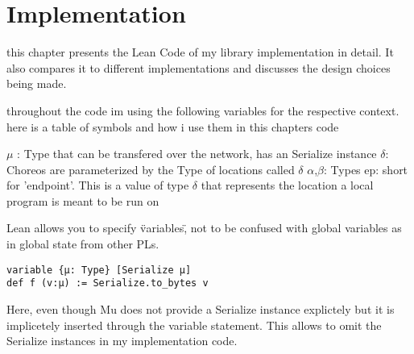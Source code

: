 \chapter{Implementation}
\label{ch:implementation}

this chapter presents the Lean Code of my library implementation in detail. It also compares it to different implementations and discusses the design choices being made.
\par
throughout the code im using the following variables for the respective context.
here is a table of symbols and how i use them in this chapters code

$\mu$ : Type that can be transfered over the network, has an Serialize instance
$\delta$: Choreos are parameterized by the Type of locations called $\delta$
$\alpha$,$\beta$: Types
ep: short for 'endpoint'. This is a value of type $\delta$ that represents the location a local program is meant to be run on

Lean allows you to specify \"variables\", not to be confused with global variables as in global state from other PLs.
\begin{lstlisting}[language=lean]
variable {μ: Type} [Serialize μ]
def f (v:μ) := Serialize.to_bytes v
\end{lstlisting}
Here, even though Mu does not provide a Serialize instance explictely but it is implicetely inserted through the variable statement. This allows to omit the Serialize instances in my implementation code.
%
%
%
%
%
%

